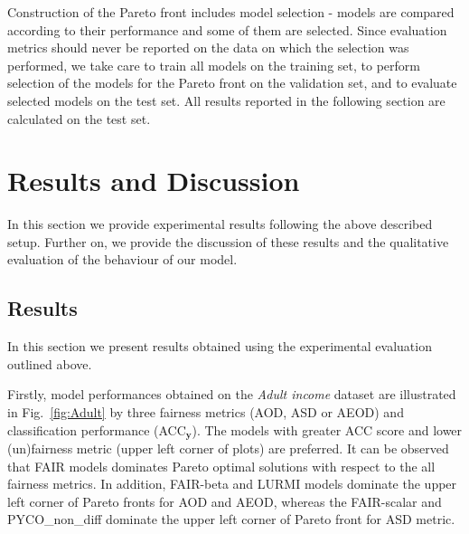 \documentclass[preprint,12pt]{elsarticle}
\begin{document}
Construction of the Pareto front includes model selection - models are compared according to their performance and some of them are selected. Since evaluation metrics should never be reported on the data on which the selection was performed, we take care to train all models on the training set, to perform selection of the models for the Pareto front on the validation set, and to evaluate selected models on the test set. All results reported in the following section are calculated on the test set.

\section{Results and Discussion}
\label{sec:ResultsDiscussion}

In this section we provide experimental results following the above described setup. Further on, we provide the discussion of these results and the qualitative evaluation of the behaviour of our model.

\subsection{Results}
\label{sec:Results}

In this section we present results obtained using the experimental evaluation outlined above.



Firstly, model performances obtained on the \textit{Adult income} dataset are illustrated in Fig.~\ref{fig:Adult} by three fairness metrics (AOD, ASD or AEOD) and classification performance (ACC$_\mathbf{y}$). The models with greater ACC score and lower (un)fairness metric (upper left corner of plots) are preferred. It can be observed that FAIR models dominates Pareto optimal solutions with respect to the all fairness metrics. In addition, FAIR-beta and LURMI models dominate the upper left corner of Pareto fronts for AOD and AEOD, whereas the FAIR-scalar and PYCO\_non\_diff dominate the upper left corner of Pareto front for ASD metric. 
\end{document}
